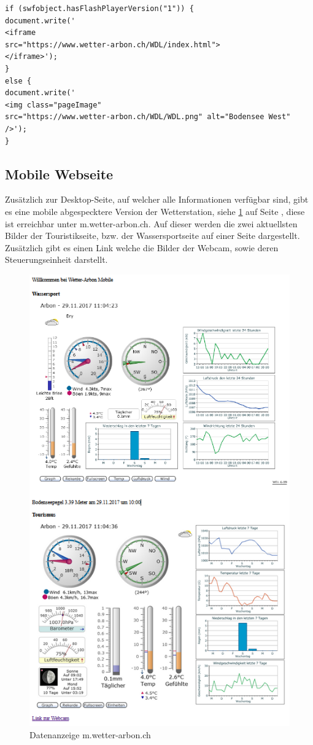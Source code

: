 \documentclass[a4paper,ngerman, 11pt, pagesize]{report}
\begin{document}
\begin{lstlisting}
if (swfobject.hasFlashPlayerVersion("1")) {
document.write('
<iframe 
src="https://www.wetter-arbon.ch/WDL/index.html">
</iframe>');
} 
else {
document.write('
<img class="pageImage" 
src="https://www.wetter-arbon.ch/WDL/WDL.png" alt="Bodensee West" 
/>');
}
\end{lstlisting}

\subsection{Mobile Webseite}
Zusätzlich zur Desktop-Seite, auf welcher alle Informationen verfügbar sind, gibt es eine mobile abgespecktere Version der Wetterstation, siehe \ref{img:mobilewebseite} auf Seite \pageref{img:mobilewebseite}, diese ist erreichbar unter m.wetter-arbon.ch. Auf dieser werden die zwei aktuellsten Bilder der Touristikseite, bzw. der Wassersportseite auf einer Seite dargestellt. Zusätzlich gibt es einen Link welche die Bilder der Webcam, sowie deren Steuerungseinheit darstellt.
\begin{figure}[htbp]
	\centering
	\includegraphics[width=0.9\linewidth]{img/mobile_webseite}
	\caption{Datenanzeige m.wetter-arbon.ch}
	\label{img:mobilewebseite}
\end{figure}
\end{document}
